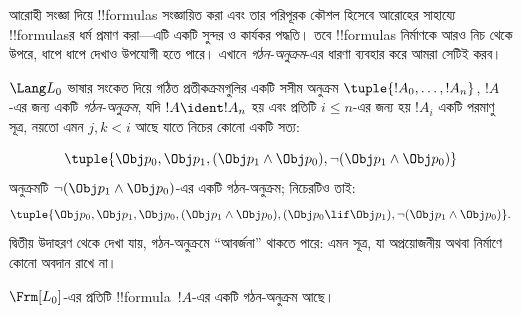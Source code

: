 \documentclass[../../../include/open-logic-section]{subfiles}
\begin{document}


আরোহী সংজ্ঞা দিয়ে !!{formula}s সংজ্ঞায়িত করা এবং তার পরিপূরক কৌশল
হিসেবে আরোহের সাহায্যে !!{formula}sর ধর্ম প্রমাণ করা—এটি একটি সুন্দর
ও কার্যকর পদ্ধতি। তবে !!{formula}s নির্মাণকে আরও নিচ থেকে উপরে,
ধাপে ধাপে দেখাও উপযোগী হতে পারে। এখানে \emph{গঠন-অনুক্রম}-এর ধারণা
ব্যবহার করে আমরা সেটিই করব।

\begin{defn}[সূত্রের গঠন-অনুক্রম]
$\Lang L_0$ ভাষার সংকেত দিয়ে গঠিত প্রতীকক্রমগুলির একটি সসীম অনুক্রম
$\tuple{!A_0,\dotsc,!A_n}$, $!A$-এর জন্য একটি \emph{গঠন-অনুক্রম},
যদি $!A \ident !A_n$ হয় এবং প্রতিটি $i \leq n$-এর জন্য হয় $!A_i$
একটি পরমাণু সূত্র, নয়তো এমন $j,k < i$ আছে যাতে নিচের কোনো একটি সত্য:
\begin{enumerate}
\end{enumerate}
\end{defn}

\begin{ex}
\[
\tuple{
    \Obj p_0,
    \Obj p_1,
    (\Obj p_1 \land \Obj p_0),
    \lnot (\Obj p_1 \land \Obj p_0)
}
\]
অনুক্রমটি
$\lnot (\Obj p_1 \land \Obj p_0)$-এর একটি গঠন-অনুক্রম; নিচেরটিও তাই:
\[
\tuple{
    \Obj p_0,
    \Obj p_1,
    \Obj p_0,
    (\Obj p_1 \land \Obj p_0),
    (\Obj p_0 \lif \Obj p_1),
    \lnot (\Obj p_1 \land \Obj p_0)
}.
\]
%
দ্বিতীয় উদাহরণ থেকে দেখা যায়, গঠন-অনুক্রমে “আবর্জনা” থাকতে পারে:
এমন সূত্র, যা অপ্রয়োজনীয় অথবা নির্মাণে কোনো অবদান রাখে না।
\end{ex}

\begin{prop}
$\Frm[L_0]$-এর প্রতিটি !!{formula}~$!A$-এর একটি গঠন-অনুক্রম আছে।
\end{prop}
\end{document}

